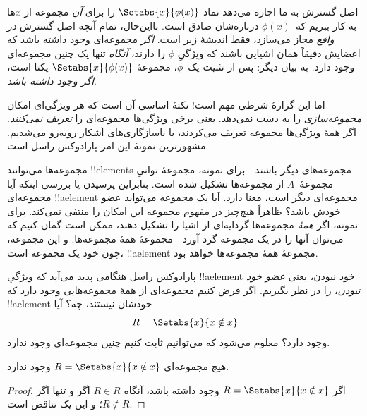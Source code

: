 \documentclass[../../../include/open-logic-section]{subfiles}
\begin{document}

اصل گسترش به ما اجازه می‌دهد نماد $\Setabs{x}{\phi(x)}$ را برای
\emph{آن} مجموعه از $x$ها به کار ببریم که~$\phi(x)$ درباره‌شان صادق
است. بااین‌حال، تمام آنچه اصل گسترش \emph{در واقع} مجاز می‌سازد، فقط
اندیشهٔ زیر است. \emph{اگر} مجموعه‌ای وجود داشته باشد که اعضایش دقیقاً
همان اشیایی باشند که ویژگیِ $\phi$ را دارند، \emph{آنگاه} تنها یک چنین
مجموعه‌ای وجود دارد. به بیان دیگر: پس از تثبیت یک~$\phi$، مجموعهٔ
$\Setabs{x}{\phi(x)}$ یکتا است، \emph{اگر وجود داشته باشد}.

اما این گزارهٔ شرطی مهم است!{} نکتهٔ اساسی آن است که هر ویژگی‌ای امکان
\emph{مجموعه‌سازی} را به دست نمی‌دهد. یعنی برخی ویژگی‌ها مجموعه‌ای را
\emph{تعریف نمی‌کنند}. اگر همهٔ ویژگی‌ها مجموعه تعریف می‌کردند، با
ناسازگاری‌های آشکار روبه‌رو می‌شدیم. مشهورترین نمونهٔ این امر پارادوکس
راسل است.

مجموعه‌ها می‌توانند !!{element}s مجموعه‌های دیگر باشند---برای نمونه،
مجموعهٔ توانیِ مجموعهٔ~$A$ از مجموعه‌ها تشکیل شده است. بنابراین
پرسیدن یا بررسی اینکه آیا مجموعه‌ای !!a{element} مجموعه‌ای دیگر است،
معنا دارد. آیا یک مجموعه می‌تواند عضو خودش باشد؟ ظاهراً هیچ‌چیز در
مفهوم مجموعه این امکان را منتفی نمی‌کند. برای نمونه، اگر \emph{همهٔ}
مجموعه‌ها گردایه‌ای از اشیا را تشکیل دهند، ممکن است گمان کنیم که
می‌توان آنها را در یک مجموعه گرد آورد---مجموعهٔ همهٔ مجموعه‌ها. و این
مجموعه، چون خود یک مجموعه است، !!a{element} مجموعهٔ همهٔ مجموعه‌ها
خواهد بود.

پارادوکس راسل هنگامی پدید می‌آید که ویژگیِ !!a{element} خود نبودن، یعنی
\emph{عضو خود نبودن}، را در نظر بگیریم. اگر فرض کنیم مجموعه‌ای از همهٔ
مجموعه‌هایی وجود دارد که !!a{element} خودشان نیستند، چه؟ آیا
\[
R = \Setabs{x}{x \notin x}
\]
وجود دارد؟ معلوم می‌شود که می‌توانیم ثابت کنیم چنین مجموعه‌ای وجود ندارد.

\begin{thm}
	هیچ مجموعه‌ای $R = \Setabs{x}{x \notin x}$ وجود ندارد.
\end{thm}

\begin{proof}
اگر $R = \Setabs{x}{x \notin x}$ وجود داشته باشد، آنگاه
$R \in R$ اگر و تنها اگر $R \notin R$؛ و این یک تناقض است.
\end{proof}
\end{document}
